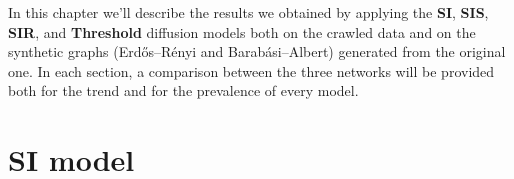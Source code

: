 In this chapter we'll describe the results we obtained by applying the \textbf{SI}, \textbf{SIS}, \textbf{SIR},
and \textbf{Threshold} diffusion models both on the crawled data and on the synthetic graphs (Erdős–Rényi and
Barabási–Albert) generated from the original one. In each section, a comparison between the three networks will be
provided both for the trend and for the prevalence of every model.

\section{SI model} %
\label{sec:si_model}
    \begin{figure}[H]
        \centering
        \begin{subfigure}{0.45\textwidth}
\end{subfigure}
\end{figure}
